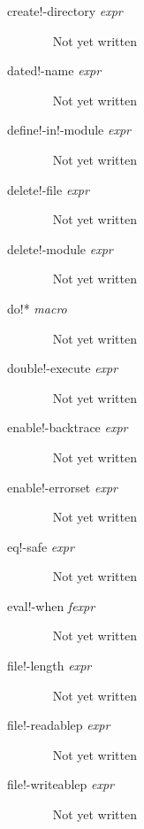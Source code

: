 \documentclass[a4paper,11pt]{article}
\begin{document}
\begin{description}
\item [{\ttfamily create!-directory} {\itshape  expr}] ~\newline
Not yet written

\item [{\ttfamily dated!-name} {\itshape  expr}] ~\newline
Not yet written

\item [{\ttfamily define!-in!-module} {\itshape  expr}] ~\newline
Not yet written

\item [{\ttfamily delete!-file} {\itshape  expr}] ~\newline
Not yet written

\item [{\ttfamily delete!-module} {\itshape  expr}] ~\newline
Not yet written

\item [{\ttfamily do!*} {\itshape macro}] ~\newline
Not yet written

\item [{\ttfamily double!-execute} {\itshape  expr}] ~\newline
Not yet written

\item [{\ttfamily enable!-backtrace} {\itshape  expr}] ~\newline
Not yet written

\item [{\ttfamily enable!-errorset} {\itshape  expr}] ~\newline
Not yet written

\item [{\ttfamily eq!-safe} {\itshape  expr}] ~\newline
Not yet written

\item [{\ttfamily eval!-when} {\itshape  fexpr}] ~\newline
Not yet written

\item [{\ttfamily file!-length} {\itshape  expr}] ~\newline
Not yet written

\item [{\ttfamily file!-readablep} {\itshape  expr}] ~\newline
Not yet written

\item [{\ttfamily file!-writeablep} {\itshape  expr}] ~\newline
Not yet written


\end{description}
\end{document}
